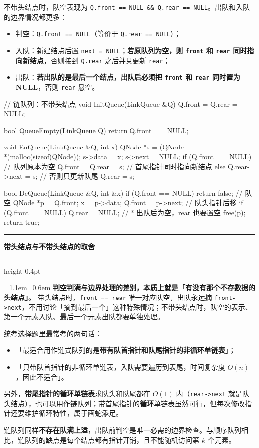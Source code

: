 \documentclass[11pt,openany,UTF8]{ctexbook}
\newcommand{\callouthead}[2]{%
  \par\addvspace{7pt}\noindent
  {\color{#1}\rule[-0.15em]{3pt}{1.05em}}\hspace{0.5em}%
  {\bfseries\color{#1}#2}\par\nobreak\vspace{-0.35em}%
  {\color{rulesep}\hrule height 0.4pt}\nobreak\vspace{0.45em}%
  \begingroup\small\setlength{\parindent}{0pt}%
  \leftskip=1.1em\rightskip=0.6em\noindent\ignorespaces}
\newcommand{\calloutend}{\par\endgroup\addvspace{7pt}}
\newenvironment{callkey}[1]{\callouthead{keybar}{#1}}{\calloutend}
\begin{document}
不带头结点时，队空表现为 \texttt{Q.front =\allowbreak{}=\allowbreak{} NULL \&\& Q.rear =\allowbreak{}=\allowbreak{} NULL}。出队和入队的边界情况都更多：

\begin{itemize}
\item 判空：\texttt{Q.front =\allowbreak{}=\allowbreak{} NULL}（等价于 \texttt{Q.rear =\allowbreak{}=\allowbreak{} NULL}）；
\item 入队：新建结点后置 \texttt{next =\allowbreak{} NULL}；\textbf{若原队列为空，则 \texttt{front} 和 \texttt{rear} 同时指向新结点}，否则接到 \texttt{Q.rear} 之后并只更新 \texttt{rear}；
\item 出队：\textbf{若出队的是最后一个结点，出队后必须把 \texttt{front} 和 \texttt{rear} 同时置为 NULL}，否则 \texttt{rear} 悬空。
\end{itemize}
\begin{codebox}
// 链队列：不带头结点
void InitQueue(LinkQueue &Q) { Q.front = Q.rear = NULL; }

bool QueueEmpty(LinkQueue Q) { return Q.front == NULL; }

void EnQueue(LinkQueue &Q, int x) {
    QNode *s = (QNode *)malloc(sizeof(QNode));
    s->data = x;
    s->next = NULL;
    if (Q.front == NULL) {          // 队列原本为空
        Q.front = Q.rear = s;       // 首尾指针同时指向新结点
    } else {
        Q.rear->next = s;           // 否则只更新队尾
        Q.rear = s;
    }
}

bool DeQueue(LinkQueue &Q, int &x) {
    if (Q.front == NULL) return false;   // 队空
    QNode *p = Q.front;
    x = p->data;
    Q.front = p->next;                   // 队头指针后移
    if (Q.front == NULL) Q.rear = NULL;  // * 出队后为空，rear 也要置空
    free(p);
    return true;
}
\end{codebox}

\begin{callkey}{带头结点与不带头结点的取舍}
\textbf{判空判满与边界处理的差别，本质上就是「有没有那个不存数据的头结点」。} 带头结点时，\texttt{front =\allowbreak{}=\allowbreak{} rear} 唯一对应队空，出队永远摘 \texttt{front->\allowbreak{}next}，不用讨论「摘到最后一个」这种特殊情况；不带头结点时，队空的表示、第一个元素入队、最后一个元素出队都要单独处理。

统考选择题里最常考的两句话：

\begin{itemize}
\item 「最适合用作链式队列的是\textbf{带有队首指针和队尾指针的非循环单链表}」；
\item 「只带队首指针的非循环单链表，入队需要遍历到表尾，时间复杂度 $O(n)$，因此不适合」。
\end{itemize}
另外，\textbf{带尾指针的循环单链表}求队头和队尾都在 $O(1)$ 内（\texttt{rear->\allowbreak{}next} 就是队头结点），也可以用作链队列；带首尾指针的\textbf{循环}单链表虽然可行，但每次修改指针还要维护循环特性，属于画蛇添足。

链队列同样\textbf{不存在队满上溢}，出队前判空是唯一必需的边界检查。与顺序队列相比，链队列的缺点是每个结点都有指针开销，且不能随机访问第 $k$ 个元素。

\end{callkey}
\end{document}
